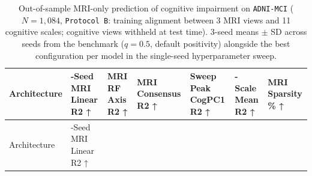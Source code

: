 \documentclass[
  10pt,
  letterpaper,
]{report}
\begin{document}
\begin{longtable}[]{@{}
  >{\raggedright\arraybackslash}p{}
  >{\raggedleft\arraybackslash}p{}
  >{\raggedleft\arraybackslash}p{}
  >{\raggedleft\arraybackslash}p{}
  >{\raggedleft\arraybackslash}p{}
  >{\raggedleft\arraybackslash}p{}
  >{\raggedleft\arraybackslash}p{}@{}}
\caption{Out-of-sample MRI-only prediction of cognitive impairment on
\protect\texttt{ADNI-MCI} (\(N = 1,084\), \protect\texttt{Protocol\ B}:
training alignment between 3 MRI views and 11 cognitive scales;
cognitive views withheld at test time). 3-seed means \(\pm\) SD across
seeds from the benchmark (\(q = 0.5\), default positivity) alongside the
best configuration per model in the single-seed hyperparameter
sweep.}\label{tbl-adni-mci-summary}\tabularnewline
\toprule\noalign{}
\begin{minipage}[b]{\linewidth}\raggedright
Architecture
\end{minipage} & \begin{minipage}[b]{\linewidth}\raggedleft
3-Seed MRI Linear R2 ↑
\end{minipage} & \begin{minipage}[b]{\linewidth}\raggedleft
MRI RF Axis R2 ↑
\end{minipage} & \begin{minipage}[b]{\linewidth}\raggedleft
MRI Consensus R2 ↑
\end{minipage} & \begin{minipage}[b]{\linewidth}\raggedleft
Sweep Peak CogPC1 R2 ↑
\end{minipage} & \begin{minipage}[b]{\linewidth}\raggedleft
11-Scale Mean R2 ↑
\end{minipage} & \begin{minipage}[b]{\linewidth}\raggedleft
MRI Sparsity \% ↑
\end{minipage} \\
\midrule\noalign{}
\endfirsthead
\toprule\noalign{}
\begin{minipage}[b]{\linewidth}\raggedright
Architecture
\end{minipage} & \begin{minipage}[b]{\linewidth}\raggedleft
3-Seed MRI Linear R2 ↑
\end{minipage} & \begin{minipage}[b]{\linewidth}\raggedleft

\end{minipage}
\end{longtable}
\end{document}

